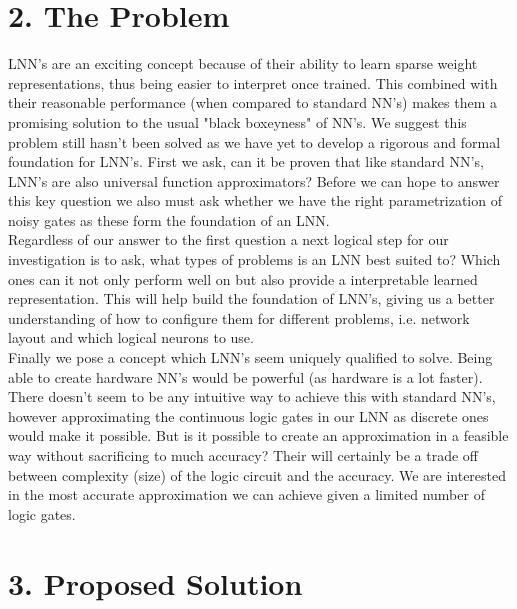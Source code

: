 \documentclass[11pt, a4paper, twoside, openright]{report}
\begin{document}
\section*{2. The Problem}

LNN's are an exciting concept because of their ability to learn sparse weight representations, thus being easier to interpret once trained. This combined with their reasonable performance (when compared to standard NN's) makes them a promising solution to the usual "black boxeyness" of NN's. We suggest this problem still hasn't been solved as we have yet to develop a rigorous and formal foundation for LNN's. First we ask, can it be proven that like standard NN's, LNN's are also universal function approximators?  Before we can hope to answer this key question we also must ask whether we have the right parametrization of noisy gates as these form the foundation of an LNN. \\

Regardless of our answer to the first question a next logical step for our investigation is to ask, what types of problems is an LNN best suited to? Which ones can it not only perform well on but also provide a interpretable learned representation. This will help build the foundation of LNN's, giving us a better understanding of how to configure them for different problems, i.e. network layout and which logical neurons to use.\\

Finally we pose a concept which LNN's seem uniquely qualified to solve. Being able to create hardware NN's would be powerful (as hardware is a lot faster). There doesn't seem to be any intuitive way to achieve this with standard NN's, however approximating the continuous logic gates in our LNN as discrete ones would make it possible. But is it possible to create an approximation in a feasible way without sacrificing to much accuracy? Their will certainly be a trade off between complexity (size) of the logic circuit and the accuracy. We are interested in the most accurate approximation we can achieve given a limited number of logic gates.

\section*{3. Proposed Solution}
\end{document}

